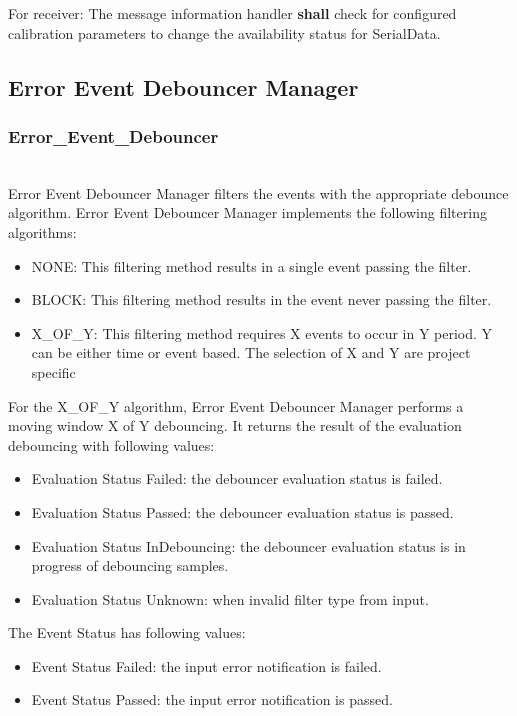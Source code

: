 For receiver:
The message information handler \textbf{shall} check for configured calibration parameters to change the availability status for SerialData.

{}


\subsection{Error Event Debouncer Manager}
\subsubsection{Error_Event_Debouncer}
\label{subsec:Error_event_debouncer}
\\

Error Event Debouncer Manager filters the events with the appropriate debounce algorithm.
Error Event Debouncer Manager implements the following filtering algorithms:
\begin{itemize}
    \item NONE: This filtering method results in a single event passing the filter.
    \item BLOCK: This filtering method results in the event never passing the filter.
    \item X_OF_Y: This filtering method requires X events to occur in Y period. Y can be either time or event based. The selection of X and Y are project specific
\end{itemize}
For the X_OF_Y algorithm, Error Event Debouncer Manager performs a moving window X of Y debouncing. It returns the
result of the evaluation debouncing with following values: 
\begin{itemize}
    \item Evaluation Status Failed: the debouncer evaluation status is failed.
    \item Evaluation Status Passed: the debouncer evaluation status is passed.
    \item Evaluation Status InDebouncing: the debouncer evaluation status is in progress of debouncing samples.
    \item Evaluation Status Unknown: when invalid filter type from input.
\end{itemize}
The Event Status has following values:
\begin{itemize}
    \item Event Status Failed: the input error notification is failed.
    \item Event Status Passed: the input error notification is passed.
\end{itemize}

